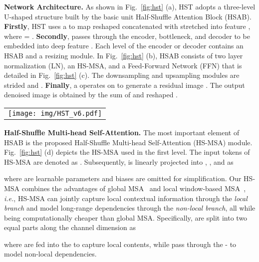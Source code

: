 \documentclass{article}
\begin{document}
\textbf{Network Architecture.}  As shown in Fig.~\ref{fig:hst} (a), HST adopts a three-level U-shaped structure  built by the basic unit Half-Shuffle Attention Block (HSAB). \textbf{Firstly}, HST uses a  to map reshaped  concatenated with stretched  into feature , where  = . \textbf{Secondly},  passes through the encoder, bottleneck, and decoder to be embedded into deep feature . Each level of the encoder or decoder contains an HSAB and a resizing module.  In Fig.~\ref{fig:hst} (b), HSAB consists of two layer normalization (LN), an HS-MSA, and a Feed-Forward Network (FFN) that is detailed in Fig.~\ref{fig:hst} (c). The downsampling and upsampling modules are strided  and . \textbf{Finally}, a  operates on  to generate a residual image  . The output denoised image  is obtained by the sum of  and reshaped .

\begin{figure*}[t]
	\begin{center}
		\begin{tabular}[t]{c} \hspace{-3.4mm}
			\texttt{[image: img/HST\_v6.pdf]}
		\end{tabular}
	\end{center}
	\vspace*{-3mm}
	\caption{\small Diagram of HST. (a) HST adopts a U-shaped structure. (b) HSAB consists of an FFN, an HS-MSA, and two layer normalization. (c) Components of FFN. (d) HS-MSA contains  and -.}
	\label{fig:hst}
	\vspace{-3mm}
\end{figure*}

\textbf{Half-Shuffle Multi-head Self-Attention.} The most important element of HSAB is the proposed Half-Shuffle Multi-head Self-Attention (HS-MSA) module. Fig.~\ref{fig:hst} (d) depicts the HS-MSA used in the first level. The input tokens of HS-MSA are denoted as .  Subsequently,   is linearly projected into  , , and   as

where  are learnable parameters and biases are omitted for simplification. Our HS-MSA combines the advantages of global MSA~\cite{global_msa} and local window-based MSA~\cite{liu2021swin}, \emph{i.e.}, HS-MSA can jointly capture local contextual information through the \emph{local branch} and model long-range dependencies through the \emph{non-local branch}, all while being computationally cheaper than global MSA. Specifically,   are split into two equal parts along the channel dimension as

where  are fed into the  to capture local contents, while   pass through the - to model non-local dependencies.
\end{document}
